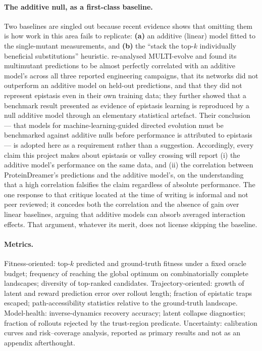 \documentclass[12pt, a4paper]{article}
\begin{document}
\paragraph{The additive null, as a first-class baseline.} Two baselines are singled out because recent evidence shows that omitting them is how work in this area fails to replicate: \textbf{(a)} an additive (linear) model fitted to the single-mutant measurements, and \textbf{(b)} the ``stack the top-$k$ individually beneficial substitutions'' heuristic. \citet{visani2026additive} re-analysed MULTI-evolve \citep{tran2026multievolve} and found its multimutant predictions to be almost perfectly correlated with an additive model's across all three reported engineering campaigns, that its networks did not outperform an additive model on held-out predictions, and that they did not represent epistasis even in their own training data; they further showed that a benchmark result presented as evidence of epistasis learning is reproduced by a null additive model through an elementary statistical artefact. Their conclusion --- that models for machine-learning-guided directed evolution must be benchmarked against additive nulls before performance is attributed to epistasis --- is adopted here as a requirement rather than a suggestion. Accordingly, every claim this project makes about epistasis or valley crossing will report (i) the additive model's performance on the same data, and (ii) the correlation between ProteinDreamer's predictions and the additive model's, on the understanding that a high correlation falsifies the claim regardless of absolute performance. The one response to that critique located at the time of writing \citep{hossain2026response} is informal and not peer reviewed; it concedes both the correlation and the absence of gain over linear baselines, arguing that additive models can absorb averaged interaction effects. That argument, whatever its merit, does not license skipping the baseline.

\paragraph{Metrics.} Fitness-oriented: top-$k$ predicted and ground-truth fitness under a fixed oracle budget; frequency of reaching the global optimum on combinatorially complete landscapes; diversity of top-ranked candidates. Trajectory-oriented: growth of latent and reward prediction error over rollout length; fraction of epistatic traps escaped; path-accessibility statistics relative to the ground-truth landscape. Model-health: inverse-dynamics recovery accuracy; latent collapse diagnostics; fraction of rollouts rejected by the trust-region predicate. Uncertainty: calibration curves and risk--coverage analysis, reported as primary results and not as an appendix afterthought.
\end{document}
